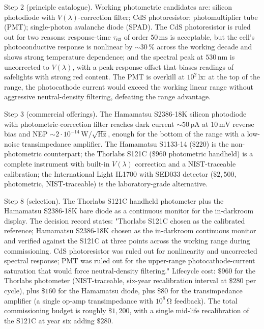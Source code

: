 Step 2 (principle catalogue). Working photometric candidates are:
silicon photodiode with $V(\lambda)$-correction filter; CdS
photoresistor; photomultiplier tube (PMT); single-photon avalanche
diode (SPAD). The CdS photoresistor is ruled out for two
reasons: response-time $\tau_{63}$ of order $50 \,\si{\milli\second}$
is acceptable, but the cell's photoconductive response is
nonlinear by $\sim 30\,\%$ across the working decade and shows
strong temperature dependence; and the spectral peak at $530 \,\si
{\nano\meter}$ is uncorrected to $V(\lambda)$, with a peak-response
offset that biases readings of safelights with strong red content.
The PMT is overkill at $10^{2} \,\si{\lux}$: at the top of the
range, the photocathode current would exceed the working linear
range without aggressive neutral-density filtering, defeating the
range advantage.

Step 3 (commercial offerings). The Hamamatsu S2386-18K silicon
photodiode with photometric-correction filter
\cite{text:ch05t3-hamamatsu-s2386-datasheet} reaches dark current
$\sim 50 \,\si{\pico\ampere}$ at $10 \,\si{\milli\volt}$ reverse
bias and NEP $\sim 2 \cdot 10^{-14} \,\si{\watt}/\sqrt{\si{\hertz}}$,
enough for the bottom of the range with a low-noise transimpedance
amplifier. The Hamamatsu S1133-14 ($\$220$) is the
non-photometric counterpart; the Thorlabs S121C ($\$960$
photometric handheld) is a complete instrument with built-in
$V(\lambda)$ correction and a NIST-traceable calibration; the
International Light IL1700 with SED033 detector ($\$2{,}500$,
photometric, NIST-traceable) is the laboratory-grade alternative.

Step 8 (selection). The Thorlabs S121C handheld photometer plus the
Hamamatsu S2386-18K bare diode as a continuous monitor for the
in-darkroom display. The decision record states: "Thorlabs S121C
chosen as the calibrated reference; Hamamatsu S2386-18K chosen as
the in-darkroom continuous monitor and verified against the
S121C at three points across the working range during commissioning.
CdS photoresistor was ruled out for nonlinearity and uncorrected
spectral response; PMT was ruled out for the upper-range
photocathode-current saturation that would force neutral-density
filtering."  Lifecycle cost: $\$960$ for the Thorlabs photometer
(NIST-traceable, six-year recalibration interval at $\$280$ per
cycle), plus $\$160$ for the Hamamatsu diode, plus $\$80$ for
the transimpedance amplifier (a single op-amp transimpedance with
$10^{8} \,\si{\ohm}$ feedback). The total commissioning budget is
roughly $\$1{,}200$, with a single mid-life recalibration of the
S121C at year six adding $\$280$.

